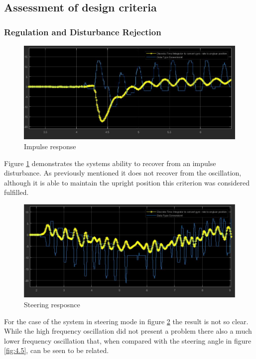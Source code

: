 \documentclass[11pt, a4paper,twocolumn]{article}
\begin{document}
        \subsection{Assessment of design criteria}\label{subsec:assessment}
            \subsubsection{Regulation and Disturbance Rejection}
	\begin{figure}[h!]
	\begin{center}
	\includegraphics[width=\linewidth]{ImpulseDisturbance}
	\caption{Impulse response}
	\label{fig:4.3}
	\end{center}
	\end{figure}
Figure \ref{fig:4.3} demonstrates the systems ability to recover from an impulse disturbance. As previously mentioned it does not recover from the oscillation, although it is able to maintain the upright position this criterion was considered fulfilled.

	\begin{figure}[h!]
	\begin{center}
	\includegraphics[width=\linewidth]{Steering}
	\caption{Steering resposnce}
	\label{fig:4.4}
	\end{center}
	\end{figure}
For the case of the system in steering mode in figure \ref{fig:4.4} the result is not so clear. While the high frequency oscillation did not present a problem there also a much lower frequency oscillation that, when compared with the steering angle in figure \ref{fig:4.5}, can be seen to be related.
\end{document}
